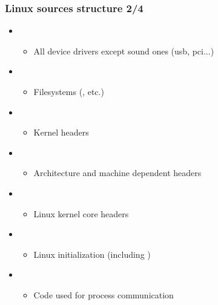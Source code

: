 \begin{frame}
  \frametitle{Linux sources structure 2/4}
  \begin{itemize}  
  \item {}
    \begin{itemize}
    \item All device drivers except sound ones (usb, pci...)
    \end{itemize}
  \item {}
    \begin{itemize}
    \item Filesystems (, etc.)
    \end{itemize}
  \item {}
    \begin{itemize}
    \item Kernel headers
    \end{itemize}
  \item {}
    \begin{itemize}
    \item Architecture and machine dependent headers
    \end{itemize}
  \item {}
    \begin{itemize}
    \item Linux kernel core headers
    \end{itemize}
  \item {}
    \begin{itemize}
    \item Linux initialization (including )
    \end{itemize}
  \item {}
    \begin{itemize}
    \item Code used for process communication
    \end{itemize}
  \end{itemize}
\end{frame}

